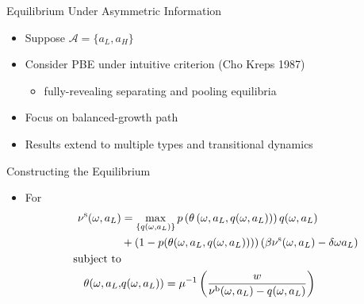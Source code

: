 \documentclass[english,xcolor=svgnames,aspectratio=169]{beamer}
\newcommand{\Buyer}{^\mathrm{b}}
\begin{document}
\begin{frame}{Equilibrium Under Asymmetric Information}

\begin{itemize}

\bigskip

\item Suppose $\mathcal A=\{a_L,a_H\}$
\bigskip

\item Consider PBE under intuitive criterion  ({\small{Cho Kreps 1987}})  
\begin{itemize}
\item fully-revealing separating and pooling equilibria 
\end{itemize}

\medskip

\item Focus on balanced-growth path  \bigskip

\item Results extend to multiple types and transitional dynamics

\end{itemize}

\end{frame}

\begin{frame}{Constructing the Equilibrium}

\begin{itemize}

\item For {\color{dred}{\bf low type}}
{\small\begin{align*}
\nu^{\mathrm{s}}(\omega,a_{L}) & = \max_{\{ q(\omega, a_{L})\}} p\left(\theta\left(\omega,a_{L},{q}(\omega, a_{L})\right)\right)  q(\omega,a_{L})    \\ \notag
&+ \left(1-  p(\theta(\omega,a_{L},{q}(\omega, a_{L})))\right) \left(\beta \nu^{\mathrm{s}}(\omega,a_{L}) - \delta \omega a_{L}\right)\\
\text{subject to}\\
\theta(\omega,a_{L},&q(\omega,a_{L})) = \mu^{-1} \left( \frac{w}{\nu\Buyer(\omega,a_{L})   - q(\omega,a_{L})} \right)
\end{align*}}


\end{itemize}

\end{frame}
\end{document}

